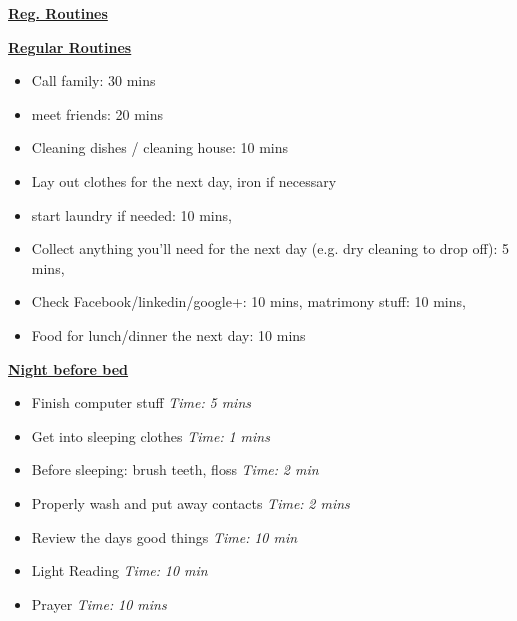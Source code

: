 \documentclass[serif,mathserif,final]{beamer}
\newcommand{\timeEst}[1]{\textit{Time:} \textit{#1}}
\begin{document}
\begin{frame}{}
\begin{columns}[t]
\begin{column}{0.27\linewidth} {\textbf{\underline{Reg. Routines}}}
\begin{block}{\small \textbf{\underline{Regular Routines}} }
\begin{itemize}
\item \tiny Call family: 30 mins
\item \tiny meet friends: 20 mins
\item \tiny Cleaning dishes / cleaning house: 10 mins
\item \tiny Lay out clothes for the next day, iron if necessary
\item \tiny start laundry if needed: 10 mins,
\item \tiny Collect anything you’ll need for the next day (e.g. dry cleaning to drop off): 5 mins,
\item \tiny Check Facebook/linkedin/google+: 10 mins, matrimony stuff: 10 mins,
\item \tiny Food for lunch/dinner the next day: 10 mins
\end{itemize}

\underline{\textbf{Night before bed}}
\begin{itemize}
\item \tiny Finish computer stuff \timeEst{5 mins}
\item \tiny Get into sleeping clothes \timeEst{1 mins}
\item \tiny Before sleeping: brush teeth, floss \timeEst{ 2 min}
\item \tiny Properly wash and put away contacts \timeEst{ 2 mins}
\item \tiny Review the days good things \timeEst{ 10 min}
\item \tiny Light Reading \timeEst{ 10 min}
\item \tiny Prayer \timeEst{10 mins}
\end{itemize}
\end{block}

\end{column}%

\end{columns} 

\end{frame} 
\end{document}

